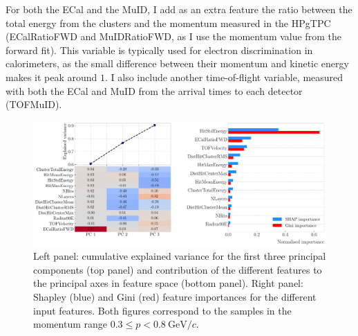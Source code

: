 For both the ECal and the MuID, I add as an extra feature the ratio between the total energy from the clusters and the momentum measured in the HPgTPC (ECalRatioFWD and MuIDRatioFWD, as I use the momentum value from the forward fit). This variable is typically used for electron discrimination in calorimeters, as the small difference between their momentum and kinetic energy makes it peak around $1$. I also include another time-of-flight variable, measured with both the ECal and MuID from the arrival times to each detector (TOFMuID).

\begin{figure}[t]
	\centering
	\includegraphics[width=.95\linewidth]{Images/GArSoft_PID/BDT/summary_pca_p0_0.55_sigmap_0.25.pdf}
	\caption[Results of the PCA, Shapley and Gini feature importance analyses for the momentum range $0.3 \leq p < 0.8 ~ \mathrm{GeV}/c$.]{Left panel: cumulative explained variance for the first three principal components (top panel) and contribution of the different features to the principal axes in feature space (bottom panel). Right panel: Shapley (blue) and Gini (red) feature importances for the different input features. Both figures correspond to the samples in the momentum range $0.3 \leq p < 0.8 ~ \mathrm{GeV}/c$.}
	\label{fig:bdt_pca_importance_ii}
\end{figure}

